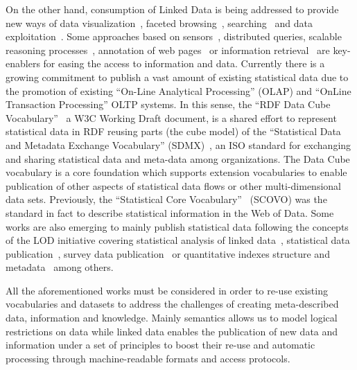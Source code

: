 On the other hand, consumption of Linked Data is being addressed to provide new ways of data 
visualization~\cite{DBLP:journals/semweb/DadzieR11,hoga-etal-2011-swse-JWS}, faceted browsing~\cite{Pietriga06fresnel,citeulike:8529753}, 
searching~\cite{hoga-etal-2011-swse-JWS} and data exploitation~\cite{Harth:2011:SIP:1963192.1963318}. Some approaches 
based on sensors~\cite{Jeung:2010:EMM:1850003.1850235,ontology-search}, distributed queries\cite{Hartig09executingsparql,Ankolekar07thetwo,sparqlOpt}, 
scalable reasoning processes~\cite{DBLP:journals/ws/UrbaniKMHB12,DBLP:journals/ws/BonattiHPS11}, 
annotation of web pages~\cite{rdfa-primer} or information retrieval~\cite{Pound} are key-enablers for easing the access 
to information and data. Currently there is a growing commitment to publish a vast amount of existing statistical data due to 
the promotion of existing ``On-Line Analytical Processing'' (OLAP) and ``OnLine Transaction Processing'' OLTP systems. 
In this sense, the ``RDF Data Cube Vocabulary''~\cite{rdf-data-cube} a W3C Working Draft document, is a shared effort to 
represent statistical data in RDF reusing parts (the cube model) of the ``Statistical Data and Metadata Exchange Vocabulary'' (SDMX)~\cite{sdmx}, an ISO standard 
for exchanging and sharing statistical data and meta-data among organizations. The Data Cube vocabulary is a core 
foundation which supports extension vocabularies to enable publication of other aspects of statistical data flows or 
other multi-dimensional data sets. Previously, the ``Statistical Core Vocabulary''~\cite{scovo} (SCOVO) was the standard in 
fact to describe statistical information in the Web of Data. Some works are also emerging to mainly publish statistical data 
following the concepts of the LOD initiative covering statistical analysis of linked data~\cite{DBLP:conf/semweb/ZapilkoM11}, 
statistical data publication~\cite{DBLP:journals/ijsc/SalasMBCMA12}, survey data publication~\cite{DDI2013,DBLP:conf/dgo/FernandezMG11} or 
quantitative indexes structure and metadata~\cite{webindexlod} among others.

All the aforementioned works must be considered in order to re-use existing vocabularies and datasets to address 
the challenges of creating meta-described data, information and knowledge. Mainly semantics allows us to model logical restrictions 
on data while linked data enables the publication of new data and information under a set of principles 
to boost their re-use and automatic processing through machine-readable formats and access protocols.


